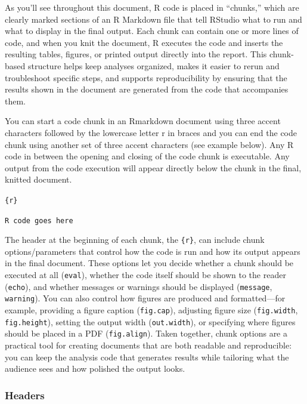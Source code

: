 \documentclass[
  11pt,
]{article}
\begin{document}
As you'll see throughout this document, R code is placed in ``chunks,''
which are clearly marked sections of an R Markdown file that tell
RStudio what to run and what to display in the final output. Each chunk
can contain one or more lines of code, and when you knit the document, R
executes the code and inserts the resulting tables, figures, or printed
output directly into the report. This chunk-based structure helps keep
analyses organized, makes it easier to rerun and troubleshoot specific
steps, and supports reproducibility by ensuring that the results shown
in the document are generated from the code that accompanies them.

You can start a code chunk in an Rmarkdown document using three accent
characters followed by the lowercase letter r in braces and you can end
the code chunk using another set of three accent characters (see example
below). Any R code in between the opening and closing of the code chunk
is executable. Any output from the code execution will appear directly
below the chunk in the final, knitted document.

\texttt{\textasciigrave{}\textasciigrave{}\textasciigrave{}\{r\}}

\texttt{R\ code\ goes\ here}

\texttt{\textasciigrave{}\textasciigrave{}\textasciigrave{}}

The header at the beginning of each chunk, the \texttt{\{r\}}, can
include chunk options/parameters that control how the code is run and
how its output appears in the final document. These options let you
decide whether a chunk should be executed at all (\texttt{eval}),
whether the code itself should be shown to the reader (\texttt{echo}),
and whether messages or warnings should be displayed (\texttt{message},
\texttt{warning}). You can also control how figures are produced and
formatted---for example, providing a figure caption (\texttt{fig.cap}),
adjusting figure size (\texttt{fig.width}, \texttt{fig.height}), setting
the output width (\texttt{out.width}), or specifying where figures
should be placed in a PDF (\texttt{fig.align}). Taken together, chunk
options are a practical tool for creating documents that are both
readable and reproducible: you can keep the analysis code that generates
results while tailoring what the audience sees and how polished the
output looks.

\subsubsection{Headers}\label{headers}
\end{document}
